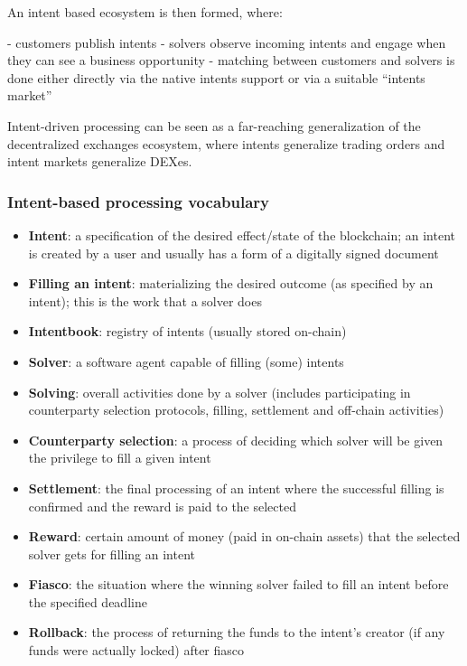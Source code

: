\documentclass[a4paper]{article}
\begin{document}
An intent based ecosystem is then formed, where:

- customers publish intents
- solvers observe incoming intents and engage when they can see a business opportunity
- matching between customers and solvers is done either directly via the native intents support or via a suitable ``intents market''

Intent-driven processing can be seen as a far-reaching generalization of the decentralized exchanges ecosystem, where intents generalize trading orders and intent markets generalize DEXes.

\subsubsection{Intent-based processing vocabulary}

\begin{itemize}
  \item \textbf{Intent}: a specification of the desired effect/state of the blockchain; an intent is created by a user and usually has a form of a digitally signed document
  \item \textbf{Filling an intent}: materializing the desired outcome (as specified by an intent); this is the work that a solver does
  \item \textbf{Intentbook}: registry of intents (usually stored on-chain)
  \item \textbf{Solver}: a software agent capable of filling (some) intents
  \item \textbf{Solving}: overall activities done by a solver (includes participating in counterparty selection protocols, filling, settlement and off-chain activities)
  \item \textbf{Counterparty selection}: a process of deciding which solver will be given the privilege to fill a given intent
  \item \textbf{Settlement}: the final processing of an intent where the successful filling is confirmed and the reward is paid to the selected
  \item \textbf{Reward}: certain amount of money (paid in on-chain assets) that the selected solver gets for filling an intent
  \item \textbf{Fiasco}: the situation where the winning solver failed to fill an intent before the specified deadline
  \item \textbf{Rollback}: the process of returning the funds to the intent’s creator (if any funds were actually locked) after fiasco
\end{itemize}
\end{document}

